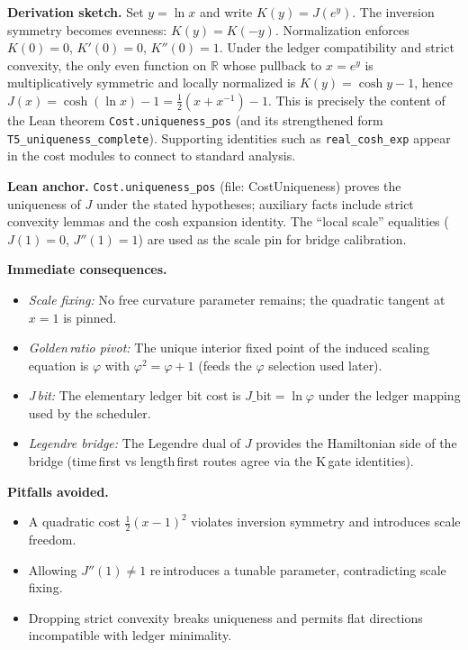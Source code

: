 \documentclass[11pt]{article}
\begin{document}
\textbf{Derivation sketch.} Set $y=\ln x$ and write $K(y)=J(e^{y})$. The inversion symmetry becomes evenness: $K(y)=K(-y)$. Normalization enforces $K(0)=0$, $K'(0)=0$, $K''(0)=1$. Under the ledger compatibility and strict convexity, the only even function on $\mathbb R$ whose pullback to $x=e^y$ is multiplicatively symmetric and locally normalized is $K(y)=\cosh y - 1$, hence $J(x)=\cosh(\ln x)-1 = \tfrac12(x+x^{-1})-1$. This is precisely the content of the Lean theorem \texttt{Cost.uniqueness\_pos} (and its strengthened form \texttt{T5\_uniqueness\_complete}). Supporting identities such as \texttt{real\_cosh\_exp} appear in the cost modules to connect to standard analysis.

\textbf{Lean anchor.} \texttt{Cost.uniqueness\_pos} (file: CostUniqueness) proves the uniqueness of $J$ under the stated hypotheses; auxiliary facts include strict convexity lemmas and the cosh expansion identity. The “local scale” equalities ($J(1)=0$, $J''(1)=1$) are used as the scale pin for bridge calibration.

\textbf{Immediate consequences.}
\begin{itemize}[leftmargin=*]
  \item \emph{Scale fixing:} No free curvature parameter remains; the quadratic tangent at $x=1$ is pinned.
  \item \emph{Golden\,ratio pivot:} The unique interior fixed point of the induced scaling equation is $\varphi$ with $\varphi^2=\varphi+1$ (feeds the $\varphi$ selection used later).
  \item \emph{J\,bit:} The elementary ledger bit cost is $J\_\mathrm{bit}=\ln \varphi$ under the ledger mapping used by the scheduler.
  \item \emph{Legendre bridge:} The Legendre dual of $J$ provides the Hamiltonian side of the bridge (time\,first vs length\,first routes agree via the K\,gate identities).
\end{itemize}

\textbf{Pitfalls avoided.}
\begin{itemize}[leftmargin=*]
  \item A quadratic cost $\tfrac12(x-1)^2$ violates inversion symmetry and introduces scale freedom.
  \item Allowing $J''(1)\ne 1$ re\,introduces a tunable parameter, contradicting scale fixing.
  \item Dropping strict convexity breaks uniqueness and permits flat directions incompatible with ledger minimality.
\end{itemize}
\end{document}
